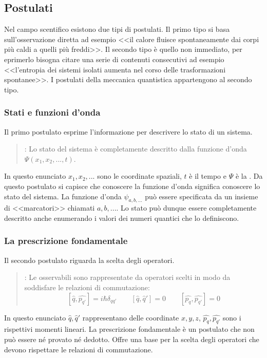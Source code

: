 \subsection{Postulati}
Nel campo scentifico esistono due tipi di postulati. Il primo tipo si basa sull'osservazione diretta ad esempio <<il calore fluisce spontaneamente dai corpi più caldi a quelli più freddi>>. Il secondo tipo è quello non immediato, per eprimerlo bisogna citare una serie di contenuti consecutivi ad esempio <<l'entropia dei sistemi isolati aumenta nel corso delle trasformazioni spontanee>>. I postulati della meccanica quantistica appartengono al secondo tipo.

\subsubsection{Stati e funzioni d'onda}
Il primo postulato esprime l'informazione per descrivere lo stato di un sistema.
\begin{quote}
: Lo stato del sistema è completamente descritto dalla funzione d'onda $\Psi(x_1, x_2, ..., t)$.
\end{quote}
In questo enunciato $x_1, x_2, ...$ sono le coordinate spaziali, $t$ è il tempo e $\Psi$ è la . Da questo postulato si capisce che conoscere la funzione d'onda significa conoscere lo stato del sistema. La funzione d'onda $\psi_{a, b, ...}$ può essere specificata da un insieme di <<marcatori>> chiamati  $a, b, ...$. Lo stato può dunque essere completamente descritto anche enumerando i valori dei numeri quantici che lo definiscono.

\subsubsection{La prescrizione fondamentale}
Il secondo postulato riguarda la scelta degli operatori.
\begin{quote}
  : Le osservabili sono rappresentate da operatori scelti in modo da soddisfare le relazioni di commutazione:
  $$ [\hat{q}, \hat{p_{q'}}] = i \hbar \delta_{qq'} \qquad [\hat{q}, \hat{q}'] = 0 \qquad [\hat{p_q}, \hat{p_{q'}}] = 0$$
\end{quote}
In questo enunciato $\hat{q}, \hat{q}'$ rappresentano delle coordinate $x, y, z$, $\hat{p_q}, \hat{p_{q'}}$ sono i rispettivi momenti lineari. La prescrizione fondamentale è un postulato che non può essere né provato né dedotto. Offre una base per la scelta degli operatori che devono rispettare le relazioni di commutazione.

